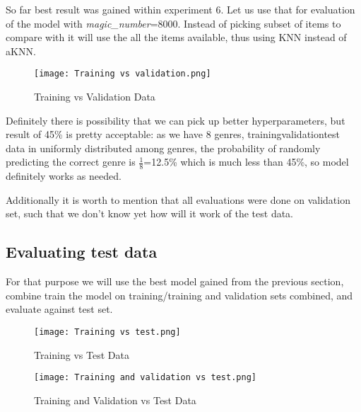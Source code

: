 \documentclass[11pt]{article}
\begin{document}
\newpage
So far best result was gained within experiment 6. Let us use that for evaluation of the model with \textit{magic\_number}=8000. Instead of picking subset of items to compare with it will use the all the items available, thus using KNN instead of aKNN.

\begin{figure}[ht]
    \begin{centering}
        \texttt{[image: Training vs validation.png]}
 	    \caption{Training vs Validation Data}
 	    {\small  }
        \label{Fig:1}  
    \end{centering}
\end{figure}

Definitely there is possibility that we can pick up better hyperparameters, but result of 45\% is pretty acceptable: as we have 8 genres, training\/validation\/test data in uniformly distributed among genres, the probability of randomly predicting the correct genre is $\frac{1}{8}$=12.5\% which is much less than 45\%, so model definitely works as needed.

Additionally it is worth to mention that all evaluations were done on validation set, such that we don't know yet how will it work of the test data.

\subsection*{Evaluating test data}

For that purpose we will use the best model gained from the previous section, combine train the model on training/training and validation sets combined, and evaluate against test set.

\begin{figure}[ht]
    \begin{centering}
        \texttt{[image: Training vs test.png]}
 	    \caption{Training vs Test Data}
 	    {\small  }
        \label{Fig:2}  
    \end{centering}
\end{figure}

\begin{figure}[ht]
    \begin{centering}
        \texttt{[image: Training and validation vs test.png]}
 	    \caption{Training and Validation vs Test Data}
 	    {\small  }
        \label{Fig:3}  
    \end{centering}
\end{figure}
\clearpage
\end{document}

